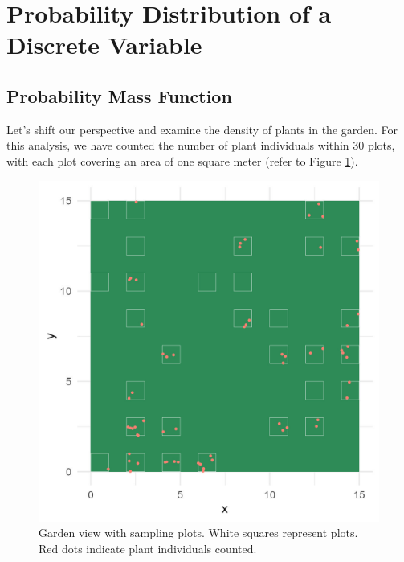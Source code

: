 \documentclass[
]{book}
\begin{document}
\hypertarget{probability-distribution-of-a-discrete-variable}{%
\section{Probability Distribution of a Discrete Variable}\label{probability-distribution-of-a-discrete-variable}}

\hypertarget{probability-mass-function}{%
\subsection{Probability Mass Function}\label{probability-mass-function}}

Let's shift our perspective and examine the density of plants in the garden. For this analysis, we have counted the number of plant individuals within 30 plots, with each plot covering an area of one square meter (refer to Figure \ref{fig:garden}).

\begin{figure}

{\centering \includegraphics[width=16.67in]{image/figure_garden} 

}

\caption{Garden view with sampling plots. White squares represent plots. Red dots indicate plant individuals counted.}\label{fig:garden}
\end{figure}
\end{document}
